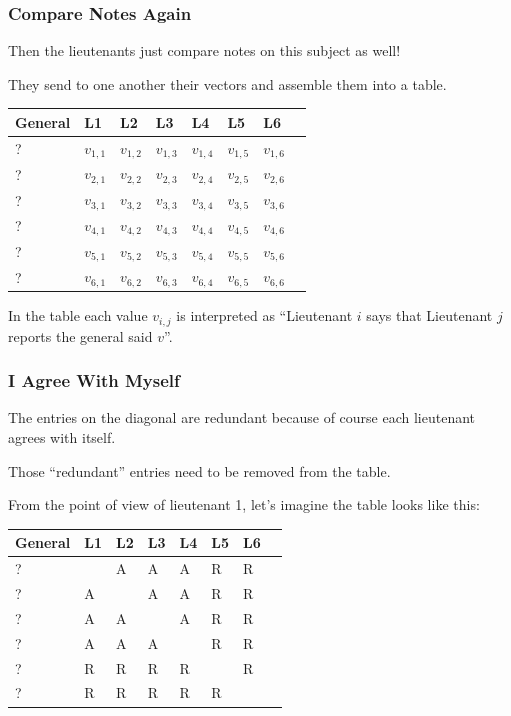 \begin{frame}
\frametitle{Compare Notes Again}

Then the lieutenants just compare notes on this subject as well!

They send to one another their vectors and assemble them into a table.

\begin{center}
\begin{tabular}{|l|l|l|l|l|l|l|l|}
\hline
General & L1 & L2 & L3 & L4 & L5 & L6 \\	
\hline
? & $v_{1,1}$ & $v_{1,2}$ & $v_{1,3}$ & $v_{1,4}$ & $v_{1,5}$ & $v_{1,6}$ \\\hline
? & $v_{2,1}$ & $v_{2,2}$ & $v_{2,3}$ & $v_{2,4}$ & $v_{2,5}$ & $v_{2,6}$ \\\hline
? & $v_{3,1}$ & $v_{3,2}$ & $v_{3,3}$ & $v_{3,4}$ & $v_{3,5}$ & $v_{3,6}$ \\\hline
? & $v_{4,1}$ & $v_{4,2}$ & $v_{4,3}$ & $v_{4,4}$ & $v_{4,5}$ & $v_{4,6}$ \\\hline
? & $v_{5,1}$ & $v_{5,2}$ & $v_{5,3}$ & $v_{5,4}$ & $v_{5,5}$ & $v_{5,6}$ \\\hline
? & $v_{6,1}$ & $v_{6,2}$ & $v_{6,3}$ & $v_{6,4}$ & $v_{6,5}$ & $v_{6,6}$ \\\hline
\end{tabular}
\end{center}

In the table each value $v_{i,j}$ is interpreted as ``Lieutenant $i$ says that Lieutenant $j$ reports the general said $v$''.

\end{frame}


\begin{frame}
\frametitle{I Agree With Myself}

The entries on the diagonal are redundant because of course each lieutenant agrees with itself.

Those ``redundant'' entries need to be removed from the table. 

From the point of view of lieutenant 1, let's imagine the table looks like this:
\begin{center}
\begin{tabular}{|l|l|l|l|l|l|l|l|}
\hline
General & L1 & L2 & L3 & L4 & L5 & L6 \\	
\hline
? & ~ & A & A & A & R & R \\ \hline
? & A & ~ & A & A & R & R \\ \hline
? & A & A & ~ & A & R & R \\ \hline
? & A & A & A & ~ & R & R \\ \hline
? & R & R & R & R & ~ & R \\ \hline
? & R & R & R & R & R & ~ \\ \hline
\end{tabular}
\end{center}

\end{frame}

